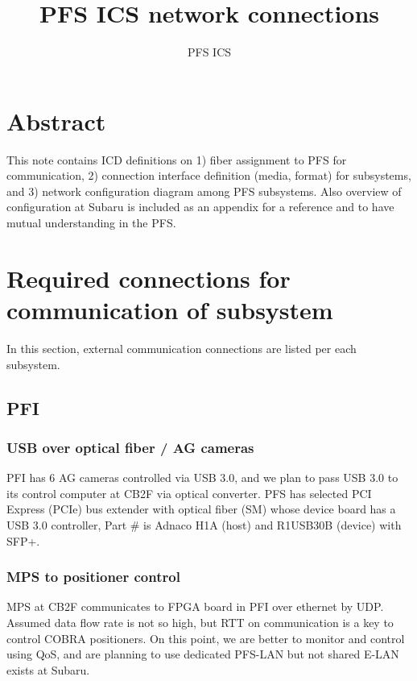 \documentclass[a4paper,notitlepage]{article}
\title{PFS ICS network connections}
\author{PFS ICS}
\begin{document}
\drafttrue
{}

\ssnhead

\section{Abstract}

This note contains ICD definitions on 
1) fiber assignment to PFS for communication, 
2) connection interface definition (media, format) for subsystems, 
and 3) network configuration diagram among PFS subsystems. 
Also overview of configuration at Subaru is included as an appendix 
for a reference and to have mutual understanding in the PFS. 


\section{Required connections for communication of subsystem}

In this section, external communication connections are listed per each 
subsystem. 

\subsection{PFI}

\subsubsection{USB over optical fiber / AG cameras}

PFI has 6 AG cameras controlled via USB 3.0, and we plan to pass USB 3.0 
to its control computer at CB2F via optical converter. 
PFS has selected PCI Express (PCIe) bus extender with optical fiber (SM) 
whose device board has a USB 3.0 controller, 
Part \# is Adnaco H1A (host) and R1USB30B (device) with SFP+. 

\subsubsection{MPS to positioner control}

MPS at CB2F communicates to FPGA board in PFI over ethernet by UDP. 
Assumed data flow rate is not so high, but RTT on communication is a key 
to control COBRA positioners. On this point, we are better to 
monitor and control using QoS, and are planning to use dedicated PFS-LAN 
but not shared E-LAN exists at Subaru. 
\end{document}

